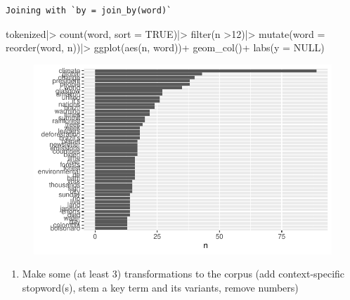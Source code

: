 \documentclass[
  letterpaper,
  DIV=11,
  numbers=noendperiod]{scrartcl}
\newenvironment{Shaded}{\begin{snugshade}}{\end{snugshade}}
\newcommand{\AttributeTok}[1]{\textcolor[rgb]{0.40,0.45,0.13}{#1}}
\newcommand{\ConstantTok}[1]{\textcolor[rgb]{0.56,0.35,0.01}{#1}}
\newcommand{\DecValTok}[1]{\textcolor[rgb]{0.68,0.00,0.00}{#1}}
\newcommand{\FunctionTok}[1]{\textcolor[rgb]{0.28,0.35,0.67}{#1}}
\newcommand{\NormalTok}[1]{\textcolor[rgb]{0.00,0.23,0.31}{#1}}
\newcommand{\SpecialCharTok}[1]{\textcolor[rgb]{0.37,0.37,0.37}{#1}}
\providecommand{\tightlist}{%
  \setlength{\itemsep}{0pt}\setlength{\parskip}{0pt}}\usepackage{longtable,booktabs,array}
\begin{document}
\begin{verbatim}
Joining with `by = join_by(word)`
\end{verbatim}

\begin{Shaded}
\begin{Highlighting}[]
\NormalTok{tokenized}\SpecialCharTok{|\textgreater{}}
  \FunctionTok{count}\NormalTok{(word, }\AttributeTok{sort =} \ConstantTok{TRUE}\NormalTok{)}\SpecialCharTok{|\textgreater{}}
  \FunctionTok{filter}\NormalTok{(n }\SpecialCharTok{\textgreater{}}\DecValTok{12}\NormalTok{)}\SpecialCharTok{|\textgreater{}}
  \FunctionTok{mutate}\NormalTok{(}\AttributeTok{word =} \FunctionTok{reorder}\NormalTok{(word, n))}\SpecialCharTok{|\textgreater{}}
  \FunctionTok{ggplot}\NormalTok{(}\FunctionTok{aes}\NormalTok{(n, word))}\SpecialCharTok{+}
  \FunctionTok{geom\_col}\NormalTok{()}\SpecialCharTok{+}
  \FunctionTok{labs}\NormalTok{(}\AttributeTok{y =} \ConstantTok{NULL}\NormalTok{)}
\end{Highlighting}
\end{Shaded}

\begin{figure}[H]

{\centering \includegraphics{lab1_Ayala_files/figure-pdf/unnamed-chunk-7-1.pdf}

}

\end{figure}

\begin{enumerate}
\def\labelenumi{\arabic{enumi}.}
\setcounter{enumi}{3}
\tightlist
\item
  Make some (at least 3) transformations to the corpus (add
  context-specific stopword(s), stem a key term and its variants, remove
  numbers)
\end{enumerate}
\end{document}
